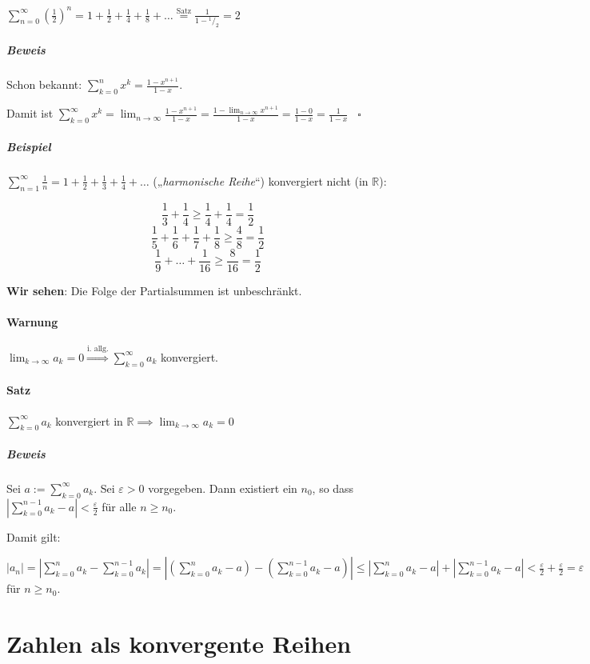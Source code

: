 \documentclass[14pt,a4paper]{article}
\newcommand*\rfrac[2]{{}^{#1}\!/_{#2}}
\begin{document}
  $\sum_{n=0}^\infty (\frac{1}{2})^n = 1 + \frac{1}{2} + \frac{1}{4} +
  \frac{1}{8} + \ldots \stackrel{\text{Satz}}{=} \frac{1}{1 - \rfrac{1}{2}} = 2$

  \subparagraph{Beweis}
  Schon bekannt: $ \sum_{k=0}^n x^k = \frac{1-x^{n+1}}{1-x} $.\par
  Damit ist $ \sum_{k=0}^{\infty} x^k = \lim_{n \to \infty} \frac{1-x^{n+1}}{1 -
  x} = \frac{1 - \lim_{n\to\infty}x^{n+1}}{1-x} = \frac{1-0}{1-x} =
  \frac{1}{1-x} \;\;\; \square$

  \subparagraph{Beispiel}
  $ \sum_{n = 1}^\infty \frac{1}{n} = 1 + \frac{1}{2} + \frac{1}{3} + \frac{1}{4}
  + \ldots $ („\textit{harmonische Reihe}“) konvergiert nicht (in $\mathbb{R}$):
  
  $$ \frac{1}{3} + \frac{1}{4} \geq \frac{1}{4} + \frac{1}{4} = \frac{1}{2} $$
  $$ \frac{1}{5} + \frac{1}{6} + \frac{1}{7} + \frac{1}{8} \geq \frac{4}{8} =
  \frac{1}{2} $$
  $$ \frac{1}{9} + \ldots + \frac{1}{16} \geq \frac{8}{16} = \frac{1}{2} $$

  \textbf{Wir sehen}: Die Folge der Partialsummen ist unbeschränkt.

  \paragraph{Warnung}
  $ \lim_{k \to \infty} a_k = 0 \stackrel{\text{i. allg.}}{\Rightarrow}
  \sum_{k=0}^\infty a_k$ konvergiert.

  \paragraph{Satz}
  $ \sum_{k=0}^\infty a_k$ konvergiert in $\mathbb{R} \implies \lim_{k \to
    \infty} a_k = 0$

  \subparagraph{Beweis}
  Sei $ a := \sum_{k=0}^\infty a_k$. Sei $ \varepsilon > 0 $ vorgegeben.
  Dann existiert ein $n_0$, so dass $ | \sum_{k=0}^{n-1} a_k -a | <
  \frac{\varepsilon}{2} $ für alle $ n \geq n_0$.

  Damit gilt:
  
  $ | a_n | = | \sum_{k = 0}^n a_k - \sum_{k=0}^{n-1} a_k | = | (\sum_{k=0}^n
  a_k - a) - (\sum_{k=0}^{n-1} a_k - a) | \leq |\sum_{k=0}^n a_k - a| + |\sum_{k=0}^{n-1} a_k - a| < \frac{\varepsilon}{2} +
  \frac{\varepsilon}{2} = \varepsilon $ für $n \geq n_0$.

  \section{Zahlen als konvergente Reihen}
  
\end{document}
